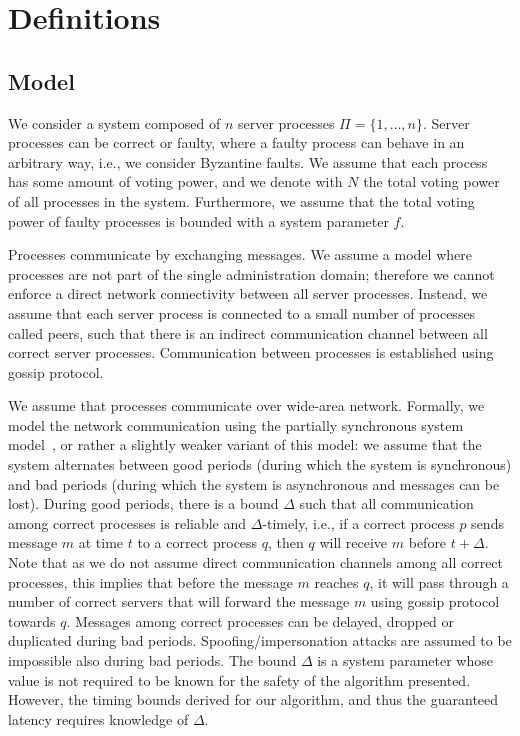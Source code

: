 \section{Definitions}
\label{sec:definitions}


\subsection{Model}

We consider a system composed of $n$ server processes $\Pi = \{ 1, \dots, n\}$.
Server processes can be correct or faulty, where a faulty process can behave in an arbitrary way,
 i.e., we consider Byzantine faults. We assume that each process has some amount of voting power, and we denote with $N$ the total voting power of all processes in the system. 
Furthermore, we assume that the total voting power of faulty processes is bounded with a system parameter $f$.

Processes communicate by exchanging messages. We assume a model where processes are not part of the single administration domain; therefore we cannot enforce a direct network connectivity between all server processes.
Instead, we assume that each server process is connected to a small number of processes called peers, 
such that there is an indirect communication channel between all correct server processes. Communication between processes is established using gossip protocol.

We assume that processes communicate over wide-area network. Formally, we model the network communication using the partially synchronous system model~\cite{DLS88:jacm}, or rather a slightly weaker variant of this model: we assume that the system alternates between good periods (during which the system is synchronous) and bad periods (during which the system is asynchronous and messages can be lost). During good periods, there is a bound $\Delta$ such that all
communication among correct processes is reliable and $\Delta$-timely, i.e., if a correct process
$p$ sends message $m$ at time $t$ to a correct process $q$, then $q$ will receive $m$
before $t+\Delta$. Note that as we do not assume direct communication channels among all correct processes, this implies that before the message $m$ reaches $q$, it will pass through a number of 
correct servers that will forward the message $m$ using gossip protocol towards $q$. 
Messages among correct processes can be
delayed, dropped or duplicated during bad periods. Spoofing/impersonation attacks are assumed to be impossible also during bad periods.
The bound $\Delta$ is a system parameter whose value is not required to be known for the safety of the algorithm presented. However, the timing bounds derived for our algorithm, and thus the guaranteed latency requires knowledge of $\Delta$.

